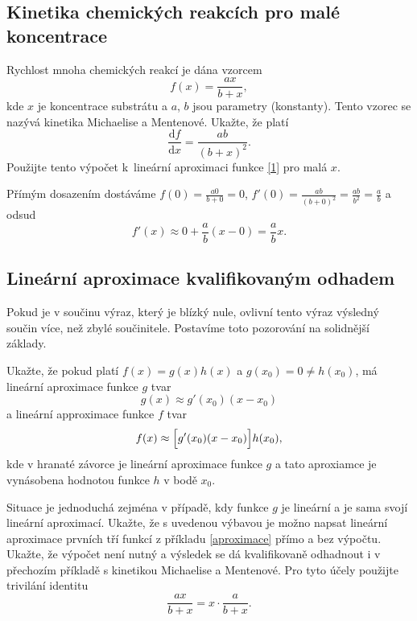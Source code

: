 \stranka

\subsection{Kinetika chemických reakcích pro malé koncentrace} Rychlost mnoha chemických reakcí je dána vzorcem
\begin{equation}\label{1}
  f(x)=\frac {ax}{b+x},
\end{equation}
kde $x$ je koncentrace substrátu a $a$, $b$ jsou parametry (konstanty). Tento vzorec se nazývá kinetika  Michaelise a Mentenové. Ukažte, že platí
\begin{equation*}
  \frac{\mathrm df}{\mathrm dx}=\frac{ab}{(b+x)^2}.
\end{equation*}
Použijte tento výpočet k lineární aproximaci funkce \eqref{1} pro malá $x$.%

\reseni

Přímým dosazením dostáváme $f(0)=\frac {a0}{b+0}=0$, $f'(0)=\frac{ab}{(b+0)^2}=\frac {ab}{b^2}=\frac ab$ a odsud
$$f'(x)\approx 0+\frac ab (x-0)=\frac ab x.$$
\konec

\stranka

\subsection{Lineární aproximace kvalifikovaným odhadem}

Pokud je v součinu výraz, který je blízký nule, ovlivní tento výraz výsledný součin více, než zbylé součinitele. Postavíme toto pozorování na solidnější základy.

Ukažte, že pokud platí $f(x)=g(x)h(x)$ a $g(x_0)=0\neq h(x_0)$, má lineární aproximace funkce $g$ tvar
$$g(x)\approx g'(x_0)(x-x_0)$$ a lineární approximace funkce $f$ tvar
$$f(x)\approx \Bigl[g'(x_0) (x-x_0)\Bigr]h(x_0),$$
kde v hranaté závorce je lineární aproximace funkce $g$ a tato aproxiamce je vynásobena hodnotou funkce $h$ v bodě $x_0$.

Situace je jednoduchá zejména v případě, kdy funkce $g$ je lineární a
je sama svojí lineární aproximací. Ukažte, že s uvedenou výbavou je možno
napsat lineární aproximace prvních tří funkcí z příkladu
\ref{aproximace} přímo a bez výpočtu. Ukažte, že výpočet není nutný a výsledek se dá kvalifikovaně odhadnout i v
přechozím příkladě s kinetikou Michaelise a Mentenové. Pro tyto účely použijte trivilání identitu
\begin{equation*}
  \frac {ax}{b+x}=x\cdot\frac {a}{b+x}.
\end{equation*}

